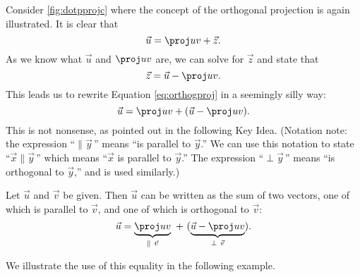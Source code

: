 
Consider \autoref{fig:dotpprojc} where the concept of the orthogonal projection is again illustrated. It is clear that 
\begin{equation}
\vec u = \proj uv + \vec z.
\label{eq:orthogproj}
\end{equation}
As we know what $\vec u$ and $\proj uv$ are, we can solve for $\vec z$ and state that
$$\vec z = \vec u - \proj uv.$$
This leads us to rewrite Equation \eqref{eq:orthogproj} in a seemingly silly way:
$$\vec u = \proj uv + (\vec u - \proj uv).$$
This is not nonsense, as pointed out in the following Key Idea. (Notation note: the expression ``$\parallel \vec y$\,'' means ``is parallel to $\vec y$.'' We can use this notation to state ``$\vec x\parallel\vec y$\,'' which means ``$\vec x$ is parallel to $\vec y$.'' The expression ``$\perp \vec y$\,'' means ``is orthogonal to $\vec y$,'' and is used similarly.)

{Let $\vec u$ and $\vec v$ be given. Then $\vec u$ can be written as the sum of two vectors, one of which is parallel to $\vec v$, and one of which is orthogonal to $\vec v$:
$$\vec u = \underbrace{\proj uv}_{\parallel\ \vec v}\ +\  (\underbrace{\vec u-\proj uv}_{\perp\ \vec v}).$$}

We illustrate the use of this equality in the following example.

